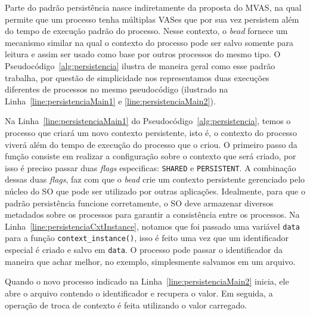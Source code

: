 Parte do padrão persistência nasce indiretamente da proposta do MVAS, na qual
permite que um processo tenha múltiplas VASes que por sua vez persistem além do
tempo de execução padrão do processo. Nesse contexto, o \emph{bead} fornece um
mecanismo similar na qual o contexto do processo pode ser salvo somente
para leitura e assim ser usado como base por outros processos do mesmo tipo. O
Pseudocódigo~\ref{alg:persistencia} ilustra de maneira geral como esse
padrão trabalha, por questão de simplicidade nos representamos duas execuções
diferentes de processos no mesmo pseudocódigo (ilustrado na
Linha~\ref{line:persistenciaMain1} e \ref{line:persistenciaMain2}).



Na Linha~\ref{line:persistenciaMain1} do Pseudocódigo~\ref{alg:persistencia},
temos o processo que criará um novo contexto persistente, isto é, o contexto do
processo viverá além do tempo de execução do processo que o criou. O primeiro
passo da função consiste em realizar a configuração sobre o contexto que será
criado, por isso é preciso passar duas \emph{flags} especificas:
\texttt{SHARED} e \texttt{PERSISTENT}. A combinação dessas duas \emph{flags},
faz com que o \emph{bead} crie um contexto persistente gerenciado pelo núcleo
do SO que pode ser utilizado por outras aplicações. Idealmente, para que o
padrão persistência funcione corretamente, o SO deve armazenar diversos
metadados sobre os processos para garantir a consistência entre os processos.
Na Linha~\ref{line:persistenciaCxtInstance}, notamos que foi passado uma
variável \texttt{data} para a função \texttt{context\_instance()}, isso é feito
uma vez que um identificador especial é criado e salvo em \texttt{data}. O
processo pode passar o identificador da maneira que achar melhor, no exemplo,
simplesmente salvamos em um arquivo.

Quando o novo processo indicado na Linha~\ref{line:persistenciaMain2} inicia,
ele abre o arquivo contendo o identificador e recupera o valor. Em seguida, a
operação de troca de contexto é feita utilizando o valor carregado.

